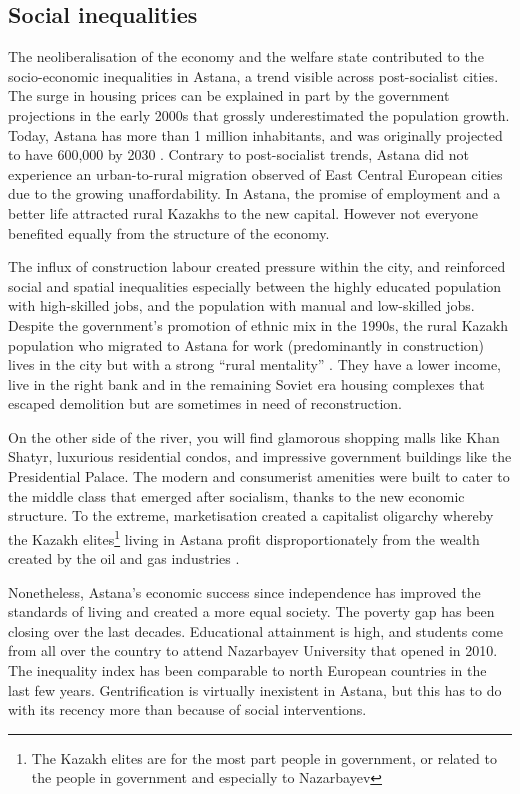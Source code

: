 \documentclass{article}
\begin{document}
\subsection{Social inequalities}

The neoliberalisation of the economy and the welfare state contributed to the socio-economic inequalities in Astana, a trend visible across post-socialist cities. The surge in housing prices can be explained in part by the government projections in the early 2000s that grossly underestimated the population growth. Today, Astana has more than 1 million inhabitants, and was originally projected to have 600,000 by 2030 \parencite{masterplan2001}. Contrary to post-socialist trends, Astana did not experience an urban-to-rural migration observed of East Central European cities due to the growing unaffordability. In Astana, the promise of employment and a better life attracted rural Kazakhs to the new capital. However not everyone benefited equally from the structure of the economy.

The influx of construction labour created pressure within the city, and reinforced social and spatial inequalities especially between the highly educated population with high-skilled jobs, and the population with manual and low-skilled jobs.
Despite the government's promotion of ethnic mix in the 1990s, the rural Kazakh population who migrated to Astana for work (predominantly in construction) lives in the city but with a strong ``rural mentality'' \parencite{koch2014bordering}. They have a lower income, live in the right bank and in the remaining Soviet era housing complexes that escaped demolition but are sometimes in need of reconstruction.

On the other side of the river,  you will find glamorous shopping malls like Khan Shatyr, luxurious residential condos, and impressive government buildings like the Presidential Palace. The modern and consumerist amenities were built to cater to the middle class that emerged after socialism, thanks to the new economic structure. To the extreme, marketisation created a capitalist oligarchy whereby the Kazakh elites\footnote{The Kazakh elites are for the most part people in government, or related to the people in government and especially to Nazarbayev} living in Astana profit disproportionately from the wealth created by the oil and gas industries \parencite{gallo2021three}.

Nonetheless, Astana's economic success since independence has improved the standards of living and created a more equal society. The poverty gap has been closing over the last decades. Educational attainment is high, and students come from all over the country to attend Nazarbayev University that opened in 2010. The inequality index has been comparable to north European countries in the last few years. Gentrification is virtually inexistent in Astana, but this has to do with its recency more than because of social interventions.
\end{document}

